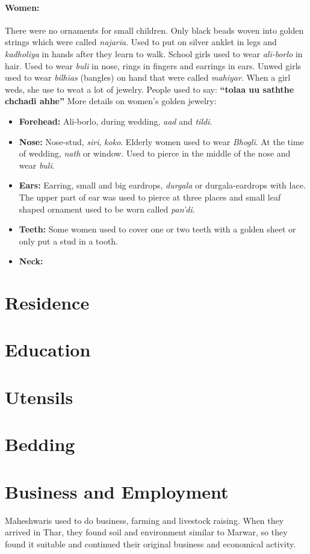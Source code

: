 \paragraph{Women:} There were no ornaments for small children. Only black beads woven into golden strings which were called \textit{najaria}. Used to put on silver anklet in legs and \textit{kadholiya} in hands after they learn to walk. School girls used to wear \textit{ali-borlo} in hair. Used to wear \textit{buli} in nose, rings in fingers and earrings in ears. Unwed girls used to wear \textit{bilhias} (bangles) on hand that were called \textit{mahiyar}. When a girl weds, she use to weat a lot of jewelry. People used to say: \textbf{``tolaa uu saththe chchadi ahhe''} More details on women's golden jewelry:
\begin{itemize}
 \item \textbf{Forehead:} Ali-borlo, during wedding, \textit{aad} and \textit{tildi}.
\item \textbf{Nose:} Nose-stud, \textit{siri}, \textit{koko}. Elderly women used to wear \textit{Bhogli}. At the time of wedding, \textit{nath} or window. Used to pierce in the middle of the nose and wear \textit{buli}.
\item \textbf{Ears:} Earring, small and big eardrops, \textit{durgala} or durgala-eardrops with lace. The upper part of ear was used to pierce at three places and small leaf shaped ornament used to be worn called \textit{pan'di}.
\item \textbf{Teeth:} Some women used to cover one or two teeth with a golden sheet or only put a stud in a tooth.
\item \textbf{Neck:}
\end{itemize}

\section{Residence}
\section{Education}
\section{Utensils}
\section{Bedding}
\section{Business and Employment}
Maheshwaris used to do business, farming and livestock raising. When they arrived in Thar, they found soil and environment similar to Marwar, so they found it suitable and continued their original business and economical activity.

